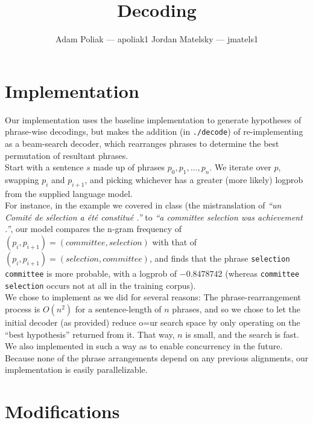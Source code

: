 \documentclass[a4paper]{article}
\title{Decoding}
\author{Adam Poliak — apoliak1 \: Jordan Matelsky — jmatels1}
\begin{document}
\maketitle

\section{Implementation}
Our implementation uses the baseline implementation to generate hypotheses of phrase-wise decodings, but makes the addition (in \texttt{./decode}) of re-implementing as a beam-search decoder, which rearranges phrases to determine the best permutation of resultant phrases. \\

Start with a sentence $s$ made up of phrases $p_0, p_1, \dots, p_n$. We iterate over $p$, swapping $p_i$ and $p_{i+1}$, and picking whichever has a greater (more likely) logprob from the supplied language model. \\

For instance, in the example we covered in class (the mistranslation of \textit{``un Comité de sélection a été constitué .''} to \textit{``a committee selection was achievement .''}, our model compares the n-gram frequency of $(p_i, p_{i+1})=({committee}, {selection})$ with that of $(p_i, p_{i+1})=({selection}, {committee})$, and finds that the phrase \texttt{selection committee} is more probable, with a logprob of $-0.8478742$ (whereas \texttt{committee selection} occurs not at all in the training corpus). \\

We chose to implement as we did for several reasons: The phrase-rearrangement process is $O(n^2)$ for a sentence-length of $n$ phrases, and so we chose to let the initial decoder (as provided) reduce o=ur search space  by only operating on the ``best hypothesis'' returned from it. That way, $n$ is small, and the search is fast. \\

We also implemented in such a way as to enable concurrency in the future. Because none of the phrase arrangements depend on any previous alignments, our implementation is easily parallelizable. \\

\section{Modifications}
\end{document}
